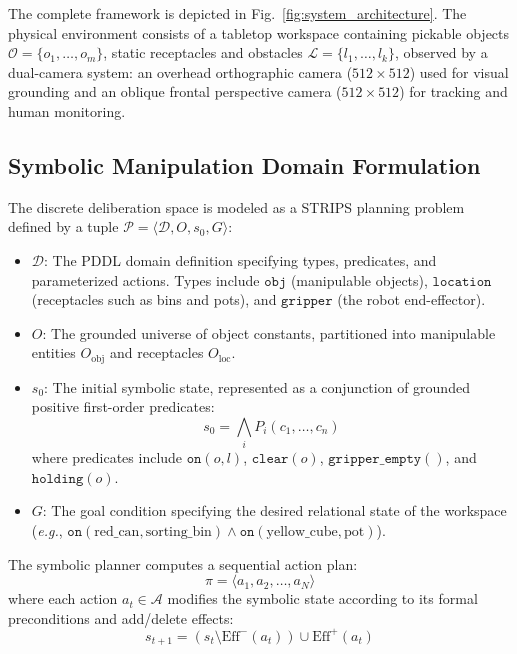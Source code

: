 \documentclass[conference]{IEEEtran}
\begin{document}
The complete framework is depicted in Fig.~\ref{fig:system_architecture}. The physical environment consists of a tabletop workspace containing pickable objects $\mathcal{O} = \{o_1, \dots, o_m\}$, static receptacles and obstacles $\mathcal{L} = \{l_1, \dots, l_k\}$, observed by a dual-camera system: an overhead orthographic camera ($512\times 512$) used for visual grounding and an oblique frontal perspective camera ($512\times 512$) for tracking and human monitoring.

\subsection{Symbolic Manipulation Domain Formulation}
The discrete deliberation space is modeled as a STRIPS planning problem defined by a tuple $\mathcal{P} = \langle \mathcal{D}, O, s_0, G \rangle$:
\begin{itemize}
    \item $\mathcal{D}$: The PDDL domain definition specifying types, predicates, and parameterized actions. Types include $\texttt{obj}$ (manipulable objects), $\texttt{location}$ (receptacles such as bins and pots), and $\texttt{gripper}$ (the robot end-effector).
    \item $O$: The grounded universe of object constants, partitioned into manipulable entities $O_{\text{obj}}$ and receptacles $O_{\text{loc}}$.
    \item $s_0$: The initial symbolic state, represented as a conjunction of grounded positive first-order predicates:
    \begin{equation}
        s_0 = \bigwedge_{i} P_i(c_1, \dots, c_n)
    \end{equation}
    where predicates include $\texttt{on}(o, l)$, $\texttt{clear}(o)$, $\texttt{gripper\_empty}()$, and $\texttt{holding}(o)$.
    \item $G$: The goal condition specifying the desired relational state of the workspace (\textit{e.g.}, $\texttt{on}(\text{red\_can}, \text{sorting\_bin}) \land \texttt{on}(\text{yellow\_cube}, \text{pot})$).
\end{itemize}

The symbolic planner computes a sequential action plan:
\begin{equation}
    \pi = \langle a_1, a_2, \dots, a_N \rangle
\end{equation}
where each action $a_t \in \mathcal{A}$ modifies the symbolic state according to its formal preconditions and add/delete effects:
\begin{equation}
    s_{t+1} = (s_t \setminus \text{Eff}^-(a_t)) \cup \text{Eff}^+(a_t)
\end{equation}
\end{document}
